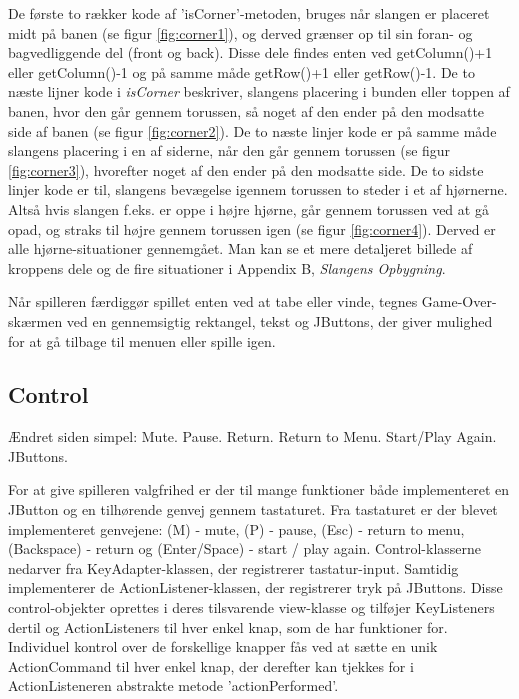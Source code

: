 De første to rækker kode af 'isCorner'-metoden, bruges når slangen er placeret midt på banen (se figur \ref{fig:corner1}), og derved grænser op til sin foran- og bagvedliggende del (front og back). Disse dele findes enten ved getColumn()+1 eller getColumn()-1 og på samme måde getRow()+1 eller getRow()-1. De to næste lijner kode i \textit{isCorner} beskriver, slangens placering i bunden eller toppen af banen, hvor den går gennem torussen, så noget af den ender på den modsatte side af banen (se figur \ref{fig:corner2}).
De to næste linjer kode er på samme måde slangens placering i en af siderne, når den går gennem torussen (se figur \ref{fig:corner3}), hvorefter noget af den ender på den modsatte side.
De to sidste linjer kode er til, slangens bevægelse igennem torussen to steder i et af hjørnerne. Altså hvis slangen f.eks. er oppe i højre hjørne, går gennem torussen ved at gå opad, og straks til højre gennem torussen igen (se figur \ref{fig:corner4}).
Derved er alle hjørne-situationer gennemgået.
Man kan se et mere detaljeret billede af kroppens dele og de fire situationer i Appendix B, \textit{Slangens Opbygning}.

\begin{figure}[h]
	\centering
	\graphicspath{ {pics/} }
	\caption{}
	\hspace{0.05\textwidth}
	\hspace{0.05\textwidth}
	\hspace{0.05\textwidth}
\end{figure}

Når spilleren færdiggør spillet enten ved at tabe eller vinde, tegnes Game-Over-skærmen ved en gennemsigtig rektangel, tekst og JButtons, der giver mulighed for at gå tilbage til menuen eller spille igen.

\subsection{Control}
Ændret siden simpel: Mute. Pause. Return. Return to Menu. Start/Play Again. JButtons.
\newline

For at give spilleren valgfrihed er der til mange funktioner både implementeret en JButton og en tilhørende genvej gennem tastaturet. Fra tastaturet er der blevet implementeret genvejene: (M) - mute, (P) - pause, (Esc) - return to menu, (Backspace) - return og (Enter/Space) - start / play again. Control-klasserne nedarver fra KeyAdapter-klassen, der registrerer tastatur-input. Samtidig implementerer de ActionListener-klassen, der registrerer tryk på JButtons. Disse control-objekter oprettes i deres tilsvarende view-klasse og tilføjer KeyListeners dertil og ActionListeners til hver enkel knap, som de har funktioner for. Individuel kontrol over de forskellige knapper fås ved at sætte en unik ActionCommand til hver enkel knap, der derefter kan tjekkes for i ActionListeneren abstrakte metode 'actionPerformed'.
\newline

